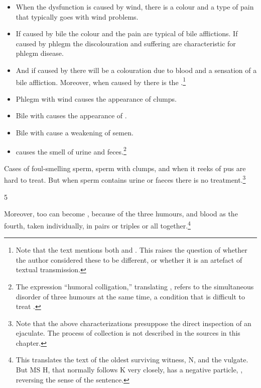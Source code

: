 \begin{translation}
 \begin{itemize}
     \item  When the dysfunction is caused by wind, there is a colour
and a type of pain that typically goes with wind problems. \item
If  caused by bile the colour and the pain are typical of bile
afflictions.  If caused by phlegm the discolouration and
suffering are characteristic for phlegm disease. \item And if
caused by  there will be a colouration due
to blood and a sensation of a bile affliction. Moreover, when
caused by  there is the .\footnote{Note that the text mentions both
     and .  This raises the question of
    whether the author considered these to be different, or whether
    it is an artefact of textual transmission.}  \item Phlegm with
    wind causes the appearance of clumps. \item   Bile with
      causes the appearance of
    . \item    Bile with
     cause a weakening of semen. \item      
     causes the smell of urine and
    feces.\footnote{The expression “humoral colligation,” translating
        , refers to the simultaneous disorder of three
        humours at the same time, a condition that is difficult to treat
        \citep[see][38 \emph{et passim}]{wuja-2016}.}
         \end{itemize}     
Cases of foul-smelling sperm, sperm with clumps, and when it reeks of
pus are hard to treat.  But when sperm contains urine or faeces there is no
treatment.\footnote{Note that the above
    characterizations presuppose the direct inspection of an ejaculate. 
    The process of collection is not described in the sources in this
    chapter.}
 
 \item[5]
 
 Moreover,  too can become
,  because of the three
humours, and blood as the fourth, taken individually, in pairs or
triples or all together.\footnote{This translates the text of the oldest
    surviving witness, N, and the vulgate.  But MS H, that normally follows
    K very closely, has a negative particle, , reversing the sense
    of the sentence.}
 

\end{translation}
